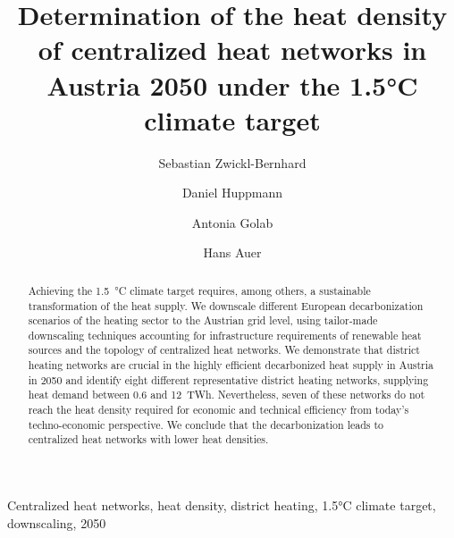 \documentclass[review]{elsarticle}
\begin{document}
\begin{frontmatter}

\title{Determination of the heat density of centralized heat networks in Austria 2050 under the 1.5°C climate target}
\author[1,2]{Sebastian Zwickl-Bernhard}
\author[2]{Daniel Huppmann}
\author[1]{Antonia Golab}
\author[1]{Hans Auer}
\address[1]{Energy Economics Group (EEG), Technische Universität Wien, Gusshausstrasse 25-29/E370-3, 1040 Wien, Austria}
\address[2]{Energy, Climate and Environment (ECE) Program,  International Institute for Applied Systems Analysis (IIASA), Laxenburg, Austria}

\begin{abstract}
	Achieving the \SI{1.5}{\degreeCelsius} climate target requires, among others, a sustainable transformation of the heat supply. We downscale different European decarbonization scenarios of the heating sector to the Austrian grid level, using tailor-made downscaling techniques accounting for infrastructure requirements of renewable heat sources and the topology of centralized heat networks. We demonstrate that district heating networks are crucial in the highly efficient decarbonized heat supply in Austria in 2050 and identify eight different representative district heating networks, supplying heat demand between \SI{0.6}{} and \SI{12}{TWh}. Nevertheless, seven of these networks do not reach the heat density required for economic and technical efficiency from today's techno-economic perspective. We conclude that the decarbonization leads to centralized heat networks with lower heat densities. 
\end{abstract}

\begin{keyword}
	Centralized heat networks, heat density, district heating, 1.5°C climate target, downscaling, 2050
\end{keyword}
\end{frontmatter}

\newpage
\end{document}
